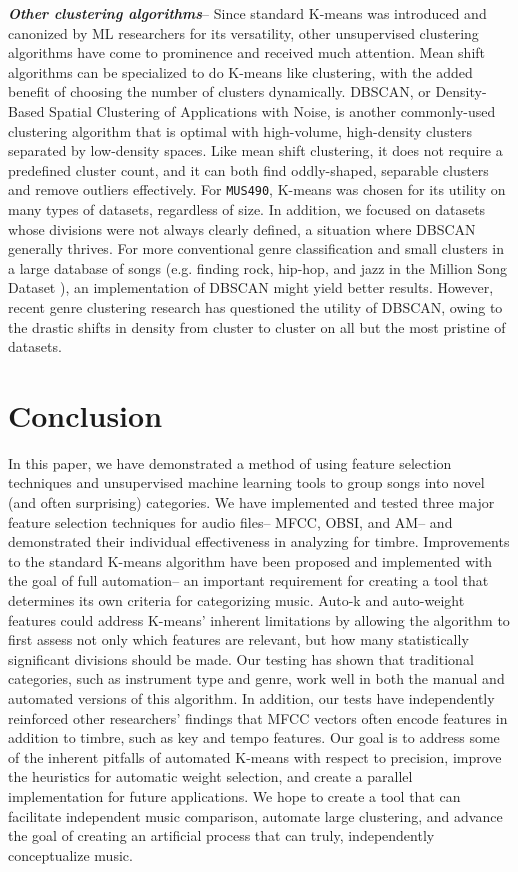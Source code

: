 \documentclass[12pt,twocolumn,titlepage]{article}
\begin{document}
\emph{\textbf{Other clustering algorithms}}-- Since standard K-means was introduced and canonized by ML researchers for its versatility, other unsupervised clustering algorithms have come to prominence and received much attention. Mean shift algorithms can be specialized to do K-means like clustering, with the added benefit of choosing the number of clusters dynamically. \cite{MeanShift} DBSCAN, or Density-Based Spatial Clustering of Applications with Noise, is another commonly-used clustering algorithm that is optimal with high-volume, high-density clusters separated by low-density spaces. Like mean shift clustering, it does not require a predefined cluster count, and it can both find oddly-shaped, separable clusters and remove outliers effectively.
For \texttt{MUS490}, K-means was chosen for its utility on many types of datasets, regardless of size. In addition, we focused on datasets whose divisions were not always clearly defined, a situation where DBSCAN generally thrives. For more conventional genre classification and small clusters in a large database of songs (e.g. finding rock, hip-hop, and jazz in the Million Song Dataset \cite{Bertin-Mahieux2011}), an implementation of DBSCAN might yield better results. However, recent genre clustering research has questioned the utility of DBSCAN, owing to the drastic shifts in density from cluster to cluster on all but the most pristine of datasets. \cite{DBSCAN}


\section{Conclusion}
\label{sec:conclusion}

In this paper, we have demonstrated a method of using feature selection techniques and unsupervised machine learning tools to group songs into novel (and often surprising) categories. We have implemented and tested three major feature selection techniques for audio files-- MFCC, OBSI, and AM-- and demonstrated their individual effectiveness in analyzing for timbre. Improvements to the standard K-means algorithm have been proposed and implemented with the goal of full automation-- an important requirement for creating a tool that determines its own criteria for categorizing music. Auto-k and auto-weight features could address K-means' inherent limitations by allowing the algorithm to first assess not only which features are relevant, but how many statistically significant divisions should be made. Our testing has shown that traditional categories, such as instrument type and genre, work well in both the manual and automated versions of this algorithm. In addition, our tests have independently reinforced other researchers' findings that MFCC vectors often encode features in addition to timbre, such as key and tempo features. Our goal is to address some of the inherent pitfalls of automated K-means with respect to precision, improve the heuristics for automatic weight selection, and create a parallel implementation for future applications. We hope to create a tool that can facilitate independent music comparison, automate large clustering, and advance the goal of creating an artificial process that can truly, independently conceptualize music.





\end{document}
